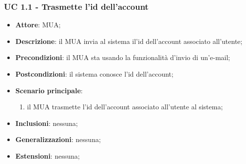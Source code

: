     \subsubsection{UC 1.1 - Trasmette l'id dell'account} \label{sec:UC1.1}
    \begin{itemize}
        \item \textbf{Attore}: MUA;
        \item \textbf{Descrizione}: il MUA invia al sistema il'id dell'account associato all'utente;
        \item \textbf{Precondizioni}: il MUA sta usando la funzionalità d'invio di un'e-mail;
        \item \textbf{Postcondizioni}: il sistema conosce l'id dell'account;
        \item \textbf{Scenario principale}:
            \begin{enumerate}
                \item il MUA trasmette l'id dell'account associato all'utente al sistema;
            \end{enumerate}
        \item \textbf{Inclusioni}: nessuna;
        \item \textbf{Generalizzazioni}: nessuna;
        \item \textbf{Estensioni}: nessuna;
    \end{itemize}

